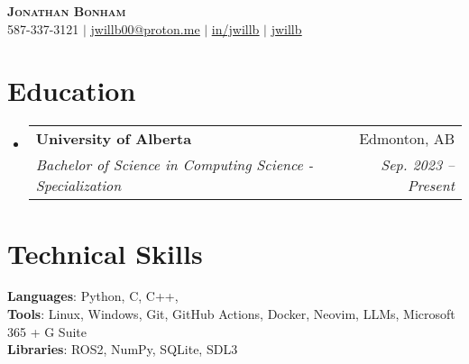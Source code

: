 \documentclass[letterpaper,11pt]{article}
\makeatletter
\newcommand{\resumeSubheading}[4]{
  \vspace{-2pt}\item
    \begin{tabular*}{0.97\textwidth}[t]{l@{\extracolsep{\fill}}r}
      \textbf{#1} & #2 \\
      \textit{\small#3} & \textit{\small #4} \\
    \end{tabular*}\vspace{-7pt}
}
\newcommand{\resumeSubHeadingListStart}{\begin{itemize}[leftmargin=0.15in, label={}]}
\newcommand{\resumeSubHeadingListEnd}{\end{itemize}}
\makeatother
\begin{document}

\begin{center}
    \textbf{\Huge \scshape Jonathan Bonham} \\ \vspace{1pt}
    \small \faPhone \hspace{0.5mm} 587-337-3121 $|$ \href{mailto:jwillb00@proton.me}{\faEnvelope \hspace{0.5mm} \underline{jwillb00@proton.me}} $|$ 
    \href{https://linkedin.com/in/jwillb}{\faLinkedinSquare \hspace{0.5mm} \underline{in/jwillb}} $|$
    \href{https://github.com/jwillb}{\faGithub \hspace{0.5mm} \underline{jwillb}}
\end{center}


\section{Education}
  \resumeSubHeadingListStart
    \resumeSubheading
      {University of Alberta}{Edmonton, AB}
      {Bachelor of Science in Computing Science - Specialization}{Sep. 2023 -- Present}
  \resumeSubHeadingListEnd

%
\section{Technical Skills}
 \begin{itemize}[leftmargin=0.15in, label={}]
    \small{\item{
     \textbf{Languages}{: Python, C, C++, } \\
     \textbf{Tools}{: Linux, Windows, Git, GitHub Actions, Docker, Neovim, LLMs, Microsoft 365 + G Suite} \\
     \textbf{Libraries}{: ROS2, NumPy, SQLite, SDL3}
    }}
 \end{itemize}
\end{document}
